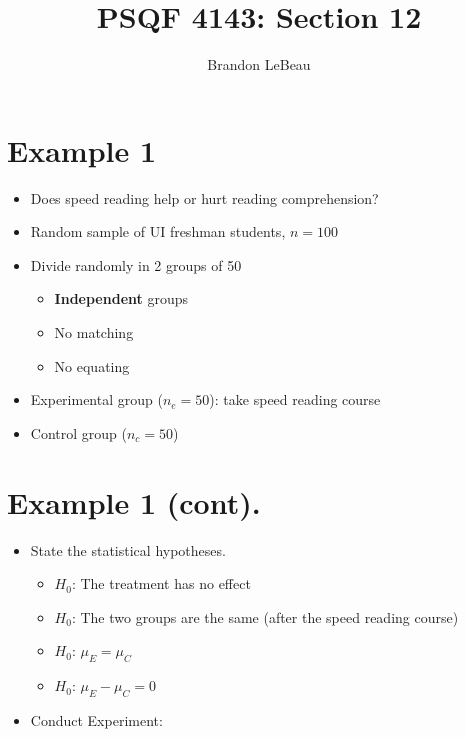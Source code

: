 \documentclass[12pt]{article}
\title{PSQF 4143: Section 12}
\author{Brandon LeBeau}
\date{}
\begin{document}
\maketitle

\section{Example 1}\label{example-1}

\begin{itemize}
\itemsep1pt\parskip0pt
\item
  Does speed reading help or hurt reading comprehension?
\item
  Random sample of UI freshman students, \(n = 100\)
\item
  Divide randomly in 2 groups of 50

  \begin{itemize}
  \itemsep1pt\parskip0pt
  \item
    \textbf{Independent} groups
  \item
    No matching
  \item
    No equating
  \end{itemize}
\item
  Experimental group (\(n_{e} = 50\)): take speed reading course
\item
  Control group (\(n_{c} = 50\))
\end{itemize}

\section{Example 1 (cont).}\label{example-1-cont.}

\begin{itemize}
\itemsep1pt\parskip0pt
\item
  State the statistical hypotheses.

  \begin{itemize}
  \itemsep1pt\parskip0pt
  \item
    \(H_{0}\): The treatment has no effect
  \item
    \(H_{0}\): The two groups are the same (after the speed reading
    course)
  \item
    \(H_{0}\): \(\mu_{E} = \mu_{C}\)
  \item
    \(H_{0}\): \(\mu_{E} - \mu_{C} = 0\)
  \end{itemize}
\item
  Conduct Experiment:
\end{itemize}
\end{document}
